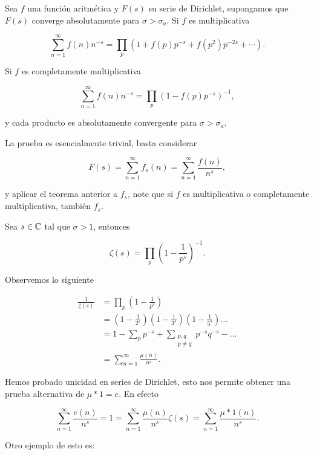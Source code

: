\begin{corollary}
Sea $f$ una función aritmética y $F(s)$ su serie de Dirichlet, supongamos que $F(s)$ converge absolutamente para $\sigma>\sigma_a$. Si $f$ es  multiplicativa

$$
\sum_{n=1}^{\infty} f(n) n^{-s}=\prod_p\left(1+f(p) p^{-s}+f\left(p^2\right) p^{-2 s}+\cdots\right).
$$

Si $f$ es completamente multiplicativa

$$
\sum_{n=1}^{\infty} f(n) n^{-s}=\prod_p\left(1-f(p) p^{-s}\right)^{-1},
$$

y cada producto es absolutamente convergente para $\sigma>\sigma_a$.
\end{corollary}

La prueba es esencialmente trivial, basta considerar

$$F(s)=\sum_{n=1}^{\infty} f_s(n)=\sum_{n=1}^{\infty} \frac{f(n)}{n^s},$$

y aplicar el teorema anterior a $f_s$, note que si $f$ es multiplicativa o completamente multiplicativa, también $f_s$.

\begin{corollary}
Sea $s\in \mathbb{C}$ tal que $\sigma>1$, entonces

$$\zeta(s)=\prod_{p}\left(1-\frac{1}{p^s}\right)^{-1}. $$
\end{corollary}

Observemos lo siguiente

$$\begin{aligned}
\frac{1}{\zeta(s)} & =\prod_{p}\left(1-\frac{1}{p^s}\right) \\
& =\left(1-\frac{1}{2^s}\right)\left(1-\frac{1}{3^s}\right)\left(1-\frac{1}{5^s}\right) \ldots \\
& =1-\sum_{p} p^{-s}+\sum_{\substack{p, q\\p\neq q}} p^{-s} q^{-s}-\ldots \\
& =\sum_{n=1}^{\infty} \frac{\mu(n)}{n^s}.
\end{aligned}$$

Hemos probado unicidad en series de Dirichlet, esto nos permite obtener una prueba alternativa de $\mu*1=e$. En efecto

$$\sum_{n=1}^{\infty} \frac{e(n)}{n^s}=1=\sum_{n=1}^{\infty} \frac{\mu(n)}{n^s}\zeta(s)=\sum_{n=1}^{\infty} \frac{\mu*1(n)}{n^s}.$$

Otro ejemplo de  esto es:

